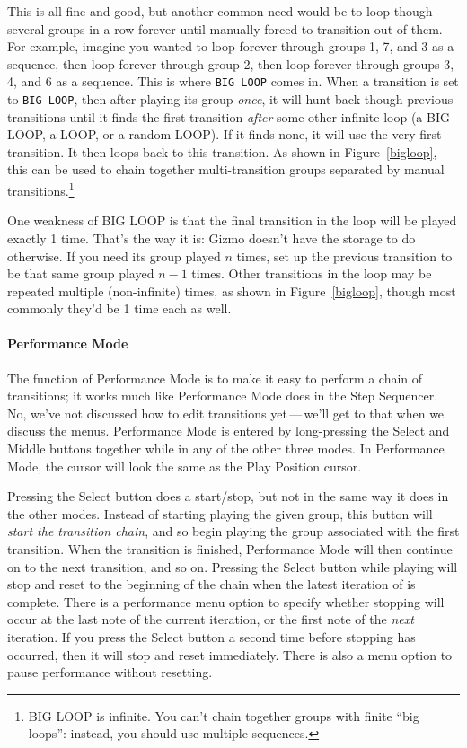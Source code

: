 \documentclass{article}
\begin{document}
This is all fine and good, but another common need would be to loop though several groups in a row forever until manually forced to transition out of them.  For example, imagine you wanted to loop forever through groups 1, 7, and 3 as a sequence, then loop forever through group 2, then loop forever through groups 3, 4, and 6 as a sequence.  This is where {\tt BIG LOOP} comes in.  When a transition is set to {\tt BIG LOOP}, then after playing its group {\it once}, it will hunt back though previous transitions until it finds the first transition {\it after} some other infinite loop (a BIG LOOP, a LOOP, or a random LOOP).  If it finds none, it will use the very first transition.  It then loops back to this transition.  As shown in Figure~\ref{bigloop}, this can be used to chain together multi-transition groups separated by manual transitions.\footnote{BIG LOOP is infinite.  You can't chain together groups with finite ``big loops'': instead, you should use multiple sequences.}

One weakness of BIG LOOP is that the final transition in the loop will be played exactly 1 time.  That's the way it is: Gizmo doesn't have the storage to do otherwise. If you need its group played \(n\) times, set up the previous transition to be that same group played \(n-1\) times.  Other transitions in the loop may be repeated multiple (non-infinite) times, as shown in Figure~\ref{bigloop}, though most commonly they'd be 1 time each as well.


\paragraph{Performance Mode}  The function of Performance Mode is to make it easy to perform a chain of transitions; it works much like Performance Mode does in the Step Sequencer. No, we've not discussed how to edit transitions yet\,---\,we'll get to that when we discuss the menus.  Performance Mode is entered by long-pressing the Select and Middle buttons together while in any of the other three modes.  In Performance Mode, the cursor will look the same as the Play Position cursor.

Pressing the Select button does a start/stop, but not in the same way it does in the other modes.  Instead of starting playing the given group, this button will {\it start the transition chain}, and so begin playing the group associated with the first transition.  When the transition is finished, Performance Mode will then continue on to the next transition, and so on.   Pressing the Select button while playing will stop and reset to the beginning of the chain when the latest iteration of is complete.  There is a performance menu option to specify whether stopping will occur at the last note of the current iteration, or the first note of the {\it next} iteration.  If you press the Select button a second time before stopping has occurred, then it will stop and reset immediately.  There is also a menu option to pause performance without resetting.  
\end{document}
